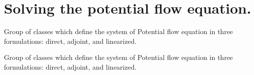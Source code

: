\hypertarget{group__Potential__Flow__Equation}{}\section{Solving the potential flow equation.}
\label{group__Potential__Flow__Equation}


Group of classes which define the system of Potential flow equation in three formulations\+: direct, adjoint, and linearized.  


Group of classes which define the system of Potential flow equation in three formulations\+: direct, adjoint, and linearized. 

